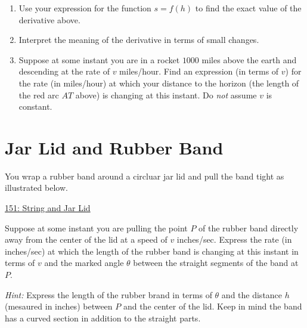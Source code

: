 \documentclass{ximera}
\begin{document}
\begin{question}
\begin{enumerate}
\item Use your expression for the function $s = f(h)$ to find the exact value of the derivative above.

\item Interpret the meaning of the derivative in terms of small changes.

\item Suppose at some instant you are in a rocket $1000$ miles above the earth and descending at the rate of $v$ miles/hour.
Find an expression (in terms of $v$) for the rate (in miles/hour) at which your distance to the horizon (the length of the red arc $AT$ above) is changing at this instant.  Do \emph{not} assume $v$ is constant.

\end{enumerate}

\end{question}



\section{Jar Lid and Rubber Band}
\begin{question}  \label{Qbnmdfgh}
You wrap a rubber band around a circluar jar lid and pull the band tight as illustrated below.

 
\begin{onlineOnly}
   \begin{center}
\end{center}
\end{onlineOnly}

\href{https://www.desmos.com/calculator/jbku3wrtdq}{151: String and Jar Lid}

Suppose at some instant you are pulling the point $P$ of the rubber band directly away from the center of the lid at a speed of $v$ inches/sec. Express the rate (in inches/sec) at which the length of the rubber band is changing at this instant in terms of $v$ and the marked angle $\theta$ between the straight segments of the band at $P$.

\emph{Hint:} Express the length of the rubber brand in terms of $\theta$ and the distance $h$ (mesaured in inches) between $P$ and the center of the lid. Keep in mind the band has a curved section in addition to the straight parts.
\end{question}
\end{document}
